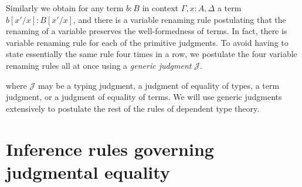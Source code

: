 Similarly we obtain for any term $b:B$ in context $\Gamma,x:A,\Delta$ a term $b[x'/x]:B[x'/x]$, and there is a variable renaming rule postulating that the renaming of a variable preserves the well-formedness of terms.
In fact, there is variable renaming rule for each of the primitive judgments. To avoid having to state essentially the same rule four times in a row, we postulate the four variable renaming rules all at once using a \emph{generic judgment} $\mathcal{J}$. 
\begin{prooftree}
\end{prooftree}
where $\mathcal{J}$ may be a typing judgment, a judgment of equality of types, a term judgment, or a judgment of equality of terms.
We will use generic judgments extensively to postulate the rest of the rules of dependent type theory.

\section{Inference rules governing judgmental equality}

